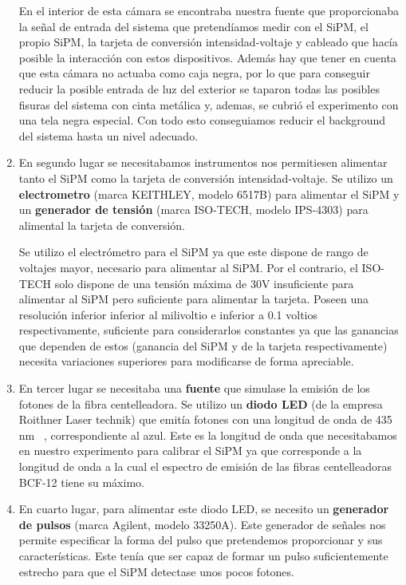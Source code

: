 \begin{enumerate}
En el interior de esta cámara se encontraba nuestra fuente que proporcionaba la señal de entrada del sistema que pretendíamos medir con el SiPM, el propio SiPM, la tarjeta de conversión intensidad-voltaje y cableado que hacía posible la interacción con estos dispositivos. Además hay que tener en cuenta que esta cámara no actuaba como caja negra, por lo que para conseguir reducir la posible entrada de luz del exterior se taparon todas las posibles fisuras del sistema con cinta metálica y, ademas, se cubrió el experimento con una tela negra especial. Con todo esto conseguiamos reducir el background del sistema hasta un nivel adecuado.

\item {} En segundo lugar se necesitabamos instrumentos nos permitiesen alimentar tanto el SiPM como la tarjeta de conversión intensidad-voltaje. Se utilizo  un \textbf{electrometro} (marca KEITHLEY, modelo 6517B) para alimentar el SiPM y un \textbf{generador de tensión} (marca ISO-TECH, modelo IPS-4303) para alimental la tarjeta de conversión.

Se utilizo el electrómetro para el SiPM ya que este dispone de rango de voltajes mayor, necesario para alimentar al SiPM. Por el contrario, el ISO-TECH solo dispone de una tensión máxima de 30V insuficiente para alimentar al SiPM pero suficiente para alimentar la tarjeta. Poseen una resolución inferior inferior al milivoltio e inferior a 0.1 voltios respectivamente, suficiente para considerarlos constantes ya que las ganancias que dependen de estos (ganancia del SiPM y de la tarjeta respectivamente) necesita variaciones superiores para modificarse de forma apreciable.

\item {} En tercer lugar se necesitaba una \textbf{fuente} que simulase la emisión de los fotones de la fibra centelleadora. 
\newline
Se utilizo un \textbf{diodo LED} (de la empresa Roithner Laser technik) que emitía fotones con una longitud de onda de 435 nm ~\cite{datasheetLED}, correspondiente al azul. Este es la longitud de onda que necesitabamos en nuestro experimento para calibrar el SiPM ya que corresponde a la longitud de onda a la cual el espectro de emisión de las fibras centelleadoras BCF-12 tiene su máximo.

\item {} En cuarto lugar, para alimentar este diodo LED, se necesito un \textbf{generador de pulsos} (marca Agilent, modelo 33250A). Este generador de señales nos permite especificar la forma del pulso que pretendemos proporcionar y sus características. Este tenía que ser capaz de formar un pulso suficientemente estrecho para que el SiPM detectase unos pocos fotones. 


\end{enumerate}
